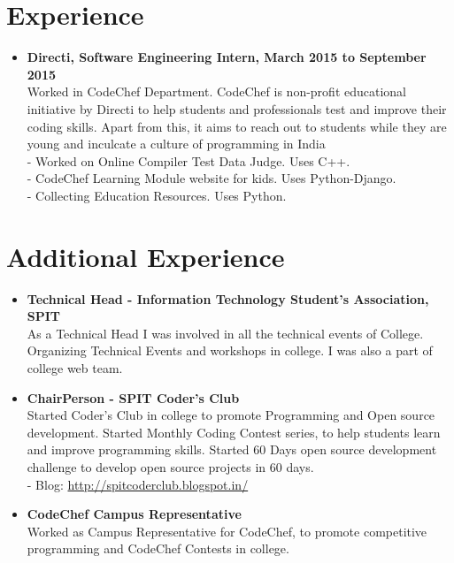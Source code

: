 \documentclass[margin,line]{res}
\begin{document}
\begin{resume}
\begin{itemize}
\end{itemize}



\section{Experience}
\begin{itemize} \itemsep -4pt

\item\textbf{Directi, Software Engineering Intern, March 2015 to September 2015}\\
Worked in CodeChef Department. CodeChef is non-profit educational initiative by Directi to help students and professionals test and improve their coding skills. Apart from this, it aims to reach out to students while they are young and inculcate a culture of programming in India\\
- Worked on Online Compiler Test Data Judge. Uses C++. \\
- CodeChef Learning Module website for kids. Uses Python-Django.\\
- Collecting Education Resources. Uses Python.

\end{itemize}

\section{Additional Experience}
\begin{itemize} \itemsep -4pt
 \item\textbf{Technical Head - Information Technology Student's Association, SPIT }\\
As a Technical Head I was involved in all the technical events of College. Organizing Technical Events and workshops in college. I was also a part of college web team.\\

 
 \item\textbf{ChairPerson -  SPIT Coder's Club}\\
Started Coder's Club in college to promote Programming and Open source development. Started Monthly Coding Contest series, to help students learn and improve programming skills. Started 60 Days open source development challenge to develop open source projects in 60 days.\\
- Blog: \url{http://spitcoderclub.blogspot.in/}
\\
\item\textbf{CodeChef Campus Representative}\\
Worked as Campus Representative for CodeChef, to promote competitive programming and CodeChef Contests in college.
\end{itemize}



\end{resume}
\end{document}
